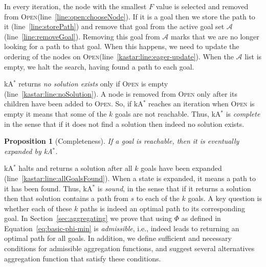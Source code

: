 \documentclass[twoside,11pt]{article}
\newtheorem{proposition}[theorem]{Proposition}
\newcommand{\kastar}{kA$^*$\xspace}
\newcommand{\open}{\textsc{Open}\xspace}
\newcommand{\activeg}{\mathcal{A}}
\newcommand{\roni}[1]{\textbf{[RS:#1]}}
\begin{document}
In every iteration, the node with the smallest $F$ value is selected and removed from \open (line~\ref{line:open:chooseNode}).
If it is a goal then we store the path to it (line~\ref{line:storePath}) and remove that goal from the active goal set $\activeg$ (line~\ref{line:removeGoal}).
Removing this goal from $\activeg$ marks that we are no longer looking for a path to that goal.
When this happens, we need to update the ordering of the nodes on \open (line~\ref{kastar:line:eager-update}).
When the $\activeg$ list is empty, we halt the search, having found a path to each goal.


\kastar returns \emph{no solution exists} only if \open is empty (line~\ref{kastar:line:noSolution}).
A node is removed from \open only after its children have been added to \open.
So, if \kastar reaches an iteration when \open is empty it means that some of the $k$ goals are not reachable.
Thus, \kastar is \emph{complete} in the sense that if it does not find a solution then indeed no solution exists.

\begin{proposition}[Completeness]
  \label{prop:completeness}
  If a goal is reachable, then it is eventually expanded by \kastar. 
\end{proposition}

\kastar halts and returns a solution after all $k$ goals have been expanded (line~\ref{kastar:line:allGoalsFound}).
When a state is expanded, it means a path to it has been found.
Thus, \kastar is \emph{sound}, in the sense that if it returns a solution then that solution contains a path from $s$ to each of the $k$ goals.
A key question is whether each of these $k$ paths is indeed an optimal path to its corresponding goal. 
In Section~\ref{sec:aggregating} we prove that 
using $\Phi$ as defined in Equation~\ref{eq:basic-phi-min} is \emph{admissible}, i.e., indeed leads to returning an optimal path for all goals. In addition, we define sufficient and necessary conditions for admissible aggregation functions, and suggest several alternatives aggregation function that satisfy these conditions. 


\end{document}
